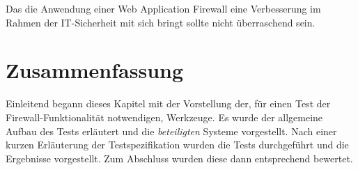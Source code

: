 Das die Anwendung einer Web Application Firewall eine Verbesserung im Rahmen der IT-Sicherheit mit sich bringt sollte nicht überraschend sein.







\section{Zusammenfassung}

Einleitend begann dieses Kapitel mit der Vorstellung der, für einen Test der Firewall-Funktionalität notwendigen, Werkzeuge. Es wurde der allgemeine Aufbau des Tests erläutert und die \emph{beteiligten} Systeme vorgestellt. Nach einer kurzen Erläuterung der Testspezifikation wurden die Tests durchgeführt und die Ergebnisse vorgestellt. Zum Abschluss wurden diese dann entsprechend bewertet.


